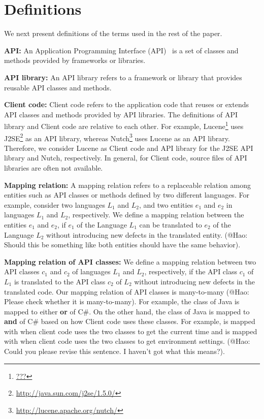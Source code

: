 \section{Definitions}
\label{sec:mapping}

We next present definitions of the terms used in the rest of the paper.

\textbf{API:} An Application Programming Interface (API)~\cite{orenstein2000quickstudy}
is a set of classes and methods provided by frameworks or libraries.

\textbf{API library:} An API library refers to a framework
or library that provides reusable API classes and methods.

\textbf{Client code:} Client code refers to the application code
that reuses or extends API classes and methods provided by API libraries.
The definitions of API library and Client code are relative to each other. 
For example, Lucene\footnote{\url{???}} uses J2SE\footnote{\url{http://java.sun.com/j2se/1.5.0/}} 
as an API library, whereas Nutch\footnote{\url{http://lucene.apache.org/nutch/}} uses
Lucene as an API library. Therefore, we consider Lucene as Client code and API library
for the J2SE API library and Nutch, respectively. In general, for Client code, 
source files of API libraries are often not available.

\textbf{Mapping relation:} A mapping relation refers to a replaceable
relation among entities such as API classes or methods defined by two different languages. For example,
consider two languages $L_1$ and $L_2$, and two entities $e_1$ and $e_2$
in languages $L_1$ and $L_2$, respectively. We define a mapping relation
between the entities $e_1$ and $e_2$, if $e_1$ of the Language $L_1$ can
be translated to $e_2$ of the Language $L_2$ without introducing new defects
in the translated entity. (@Hao: Should this be something like both entities
should have the same behavior).

\textbf{Mapping relation of API classes:} We define a mapping relation between 
two API classes $c_1$ and $c_2$ of languages $L_1$ and $L_2$, respectively, 
if the API class $c_1$ of $L_1$ is translated to the API class $c_2$ of $L_2$ 
without introducing new defects in the translated code. Our mapping
relation of API classes is many-to-many (@Hao: Please check whether it is many-to-many). For example, 
the  class of Java is mapped to either 
 \textbf{or}  of C\#.
On the other hand, the  class of Java is mapped
to  \textbf{and}  of C\#
based on how Client code uses these classes. For example,
 is mapped with 
when client code uses the two classes to get the current time and is
mapped with  when client code uses the
two classes to get environment settings. (@Hao: Could you please revise
this sentence. I haven't got what this means?).


